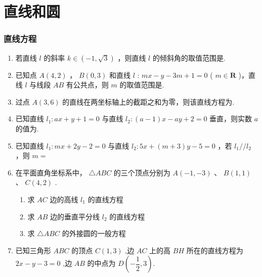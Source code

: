 \chapter*{直线和圆}
\subsection*{直线方程}
\begin{enumerate}
    \item 若直线 $l$ 的斜率 $k \in \left( -1,\sqrt{3}\right)$ ，则直线 $l$ 的倾斜角的取值范围是\blkda[3]{$\left[0, \dfrac{\pi}{3}\right) \cup \left(\dfrac{3\pi}{4}, \pi\right)$}.
    \item 已知点 $A(4,2)$ ， $B(0,3)$ 和直线 $l$ : $mx - y - 3m + 1 = 0$ ( $m \in \mathbf{R}$ )，直线 $l$ 与线段 $AB$ 有公共点，则 $m$ 的取值范围是\blkda[3]{$\left(-\infty, -\dfrac{2}{3}\right]\cup \left[1, +\infty\right)$}.
    \item 过点 $A(3,6)$ 的直线在两坐标轴上的截距之和为零，则该直线方程为.
    \item 已知直线 $l_1 : ax + y + 1 = 0$ 与直线 $l_2 : (a - 1) x - ay + 2 = 0$ 垂直，则实数 $a$ 的值为.
    \item 已知直线 $l_1 : mx + 2y - 2 = 0$ 与直线 $l_2 : 5x + (m + 3) y - 5 = 0$ ，若 $l_1//l_2$ ，则 $m =$ 
    \item 在平面直角坐标系中， $\bigtriangleup ABC$ 的三个顶点分别为 $A(-1, - 3)$ 、 $B(1,1)$ 、 $C(4,2)$ .
    \begin{enumerate}
        \item 求 $AC$ 边的高线 $l_1$ 的直线方程
        \item 求 $AB$ 边的垂直平分线 $l_2$ 的直线方程
        \item 求 $\bigtriangleup ABC$ 的外接圆的一般方程
    \end{enumerate}
    \begin{jieda}
    \end{jieda}
    \item 已知三角形 $ABC$ 的顶点 $C(1,3)$ ,边 $AC$ 上的高 $BH$ 所在的直线方程为 $2x - y - 3 = 0$ ,边 $AB$ 的中点为 $D\left( -\dfrac{1}{2},3\right)$.
    \begin{enumerate}

\end{enumerate}
\end{enumerate}
